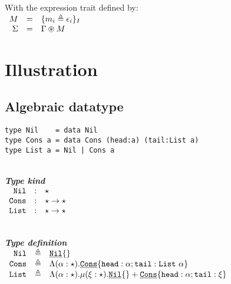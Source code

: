 \documentclass{article}[11pt]
\newcommand{\subsubsubsection}[1]
{
    ~\\
    {\bf {\em #1}} \\
}
\newcommand{\term}[1]{\verb~#1~}
\newcommand{\cons}[1]{\underline{\verb~#1~}}
\begin{document}
    With the expression trait defined by: \\

    \begin{math}
        \begin{array}{rclp{5cm}}
            M      & = & \{ m_i \triangleq \epsilon_i \}_I \\
            \Sigma & = & \Gamma \circledast M              \\
        \end{array}
    \end{math}


    \section{Illustration}\label{sec:illustration}

    \subsection{Algebraic datatype}\label{subsec:algebraic-datatype}

    \begin{verbatim}
type Nil    = data Nil
type Cons a = data Cons (head:a) (tail:List a)
type List a = Nil | Cons a
    \end{verbatim}

    \subsubsubsection{Type kind}

    \noindent
    \begin{math}
        \begin{array}{rclp{5cm}}
            \term{Nil}  & : & \star                   \\
            \term{Cons} & : & \star \rightarrow \star \\
            \term{List} & : & \star \rightarrow \star
        \end{array}
    \end{math}

    \subsubsubsection{Type definition}

    \noindent
    \begin{math}
        \begin{array}{rclp{5cm}}
            \term{Nil}  & \triangleq & \cons{Nil}\{\}                                                                                \\
            \term{Cons} & \triangleq & \Lambda(\alpha:\star).\cons{Cons}\{ \term{head} :\alpha; \term{tail} : \term{List} ~ \alpha \} \\
            \term{List} & \triangleq & \Lambda(\alpha:\star).\mu(\xi:\star).\cons{Nil}\{\} + \cons{Cons}\{ \term{head} :\alpha; \term{tail} : \xi \}
        \end{array}
    \end{math}
\end{document}
